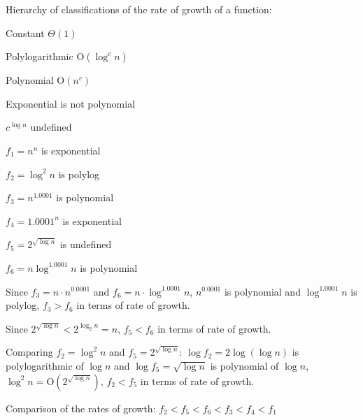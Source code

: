 Hierarchy of classifications of the rate of growth of a function:

Constant $\Theta(1)$

Polylogarithmic $\mathrm{O} (\log^c n)$

Polynomial $\mathrm{O} (n^c)$

Exponential is not polynomial

$c^{\log n}$ undefined

\begin{ex}
$f_1 = n^n$ is exponential

$f_2 = \log^2 n$ is polylog

$f_3 = n^{1.0001}$ is polynomial

$f_4 = 1.0001^n$ is exponential

$f_5 = 2^{\sqrt{\log n}}$ is undefined

$f_6 = n \log^{1.0001} n$ is polynomial

Since $f_3 = n \cdot n^{0.0001}$ and $f_6 = n \cdot \log^{1.0001} n$, $ n^{0.0001}$ is polynomial and $\log^{1.0001} n$ is polylog, $f_3 > f_6$ in terms of rate of growth.

Since $2^{\sqrt{\log n}} < 2^{\log_2 n} = n$, $f_5 < f_6$ in terms of rate of growth.

Comparing $f_2 = \log^2 n$ and $f_5 = 2^{\sqrt{\log n}}$: $\log f_2 = 2 \log(\log n)$ is polylogarithmic of $\log n$ and $\log f_5 = \sqrt{\log n}$ is polynomial of $\log n$, $\log^2 n = \mathrm{O} (2^{\sqrt{\log n}})$, $f_2 < f_5$ in terms of rate of growth.

Comparison of the rates of growth: $f_2 < f_5 < f_6 < f_3 < f_4 < f_1$
\end{ex}

